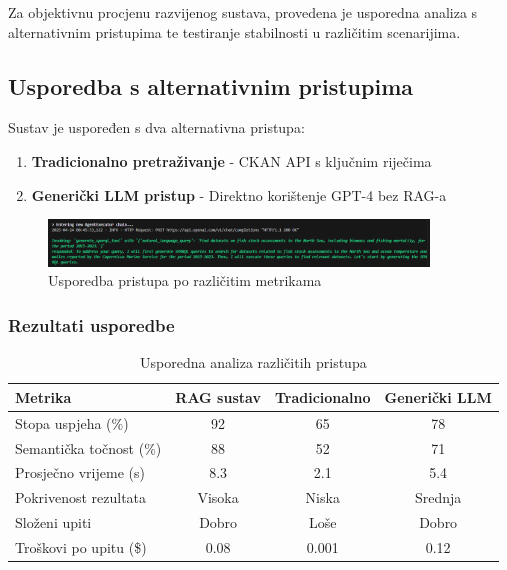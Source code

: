 Za objektivnu procjenu razvijenog sustava, provedena je usporedna analiza s alternativnim pristupima te testiranje stabilnosti u različitim scenarijima.

\subsection{Usporedba s alternativnim pristupima}

Sustav je uspoređen s dva alternativna pristupa:

\begin{enumerate}
    \item \textbf{Tradicionalno pretraživanje} - CKAN API s ključnim riječima
    \item \textbf{Generički LLM pristup} - Direktno korištenje GPT-4 bez RAG-a
\end{enumerate}

\begin{figure}[htbp]
    \centering
    \includegraphics[width=0.9\textwidth]{figures/izvjestaj_image_70.png}
    \caption{Usporedba pristupa po različitim metrikama}
    \label{fig:approach_comparison}
\end{figure}

\subsubsection{Rezultati usporedbe}

\begin{table}[htbp]
\centering
\caption{Usporedna analiza različitih pristupa}
\label{tab:comparative_analysis}
\begin{tabular}{|l|c|c|c|}
\hline
\textbf{Metrika} & \textbf{RAG sustav} & \textbf{Tradicionalno} & \textbf{Generički LLM} \\
\hline
Stopa uspjeha (\%) & 92 & 65 & 78 \\
Semantička točnost (\%) & 88 & 52 & 71 \\
Prosječno vrijeme (s) & 8.3 & 2.1 & 5.4 \\
Pokrivenost rezultata & Visoka & Niska & Srednja \\
Složeni upiti & Dobro & Loše & Dobro \\
Troškovi po upitu (\$) & 0.08 & 0.001 & 0.12 \\
\hline
\end{tabular}
\end{table}

